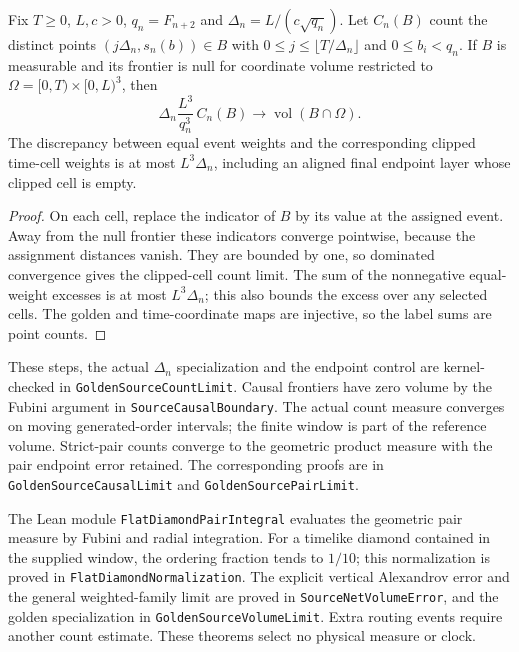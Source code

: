 \begin{proposition}
\label{prop:source-golden-event-count}
Fix $T\ge0$, $L,c>0$, $q_n=F_{n+2}$ and
$\Delta_n=L/(c\sqrt{q_n})$. Let $C_n(B)$ count the distinct points
$(j\Delta_n,s_n(b))\in B$ with $0\le j\le\lfloor T/\Delta_n\rfloor$
and $0\le b_i<q_n$. If $B$ is measurable and its frontier is null for
coordinate volume restricted to $\Omega=[0,T)\times[0,L)^3$, then
\[
 \Delta_n\frac{L^3}{q_n^3}\,C_n(B)
 \longrightarrow \operatorname{vol}(B\cap\Omega).
\]
The discrepancy between equal event weights and the corresponding clipped
time-cell weights is at most $L^3\Delta_n$, including an aligned final
endpoint layer whose clipped cell is empty.
\end{proposition}
\begin{proof}
On each cell, replace the indicator of $B$ by its value at the assigned
event. Away from the null frontier these indicators converge pointwise,
because the assignment distances vanish. They are bounded by one, so
dominated convergence gives the clipped-cell count limit. The sum of the
nonnegative equal-weight excesses is at most $L^3\Delta_n$; this also
bounds the excess over any selected cells. The golden and time-coordinate
maps are injective, so the label sums are point counts.
\end{proof}
These steps, the actual $\Delta_n$ specialization and the endpoint control
are kernel-checked in \texttt{GoldenSourceCountLimit}.
Causal frontiers have zero volume by the Fubini argument in
\texttt{SourceCausalBoundary}. The actual count measure
converges on moving generated-order intervals; the finite window is part of
the reference volume. Strict-pair counts converge to the geometric product
measure with the pair endpoint error retained. The corresponding proofs are
in \texttt{GoldenSourceCausalLimit} and
\texttt{GoldenSourcePairLimit}.

The Lean module \texttt{FlatDiamondPairIntegral} evaluates the geometric
pair measure by Fubini and radial integration. For a timelike diamond
contained in the supplied window, the ordering fraction tends to $1/10$;
this normalization is proved in
\texttt{FlatDiamondNormalization}. The explicit vertical
Alexandrov error and the general weighted-family limit are proved in
\texttt{SourceNetVolumeError}, and the golden
specialization in \texttt{GoldenSourceVolumeLimit}. Extra
routing events require another count estimate. These theorems select no
physical measure or clock.


